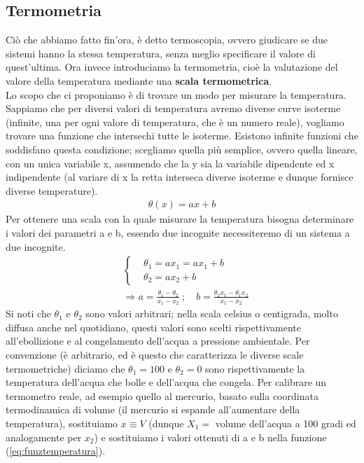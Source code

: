 \documentclass[
10pt, %
a4paper, %
oneside, %
headinclude,footinclude, %
BCOR5mm, %
]{scrartcl}
\begin{document}
\subsection{Termometria}
Ciò che abbiamo fatto fin'ora, è detto termoscopia, ovvero giudicare se due sistemi hanno la stessa temperatura, senza meglio specificare il valore di quest'ultima. Ora invece introduciamo la termometria, cioè la valutazione del valore della temperatura mediante una \textbf{scala termometrica}. \\
Lo scopo che ci proponiamo è di trovare un modo per misurare la temperatura. Sappiamo che per diversi valori di temperatura avremo diverse curve isoterme (infinite, una per ogni valore di temperatura, che è un numero reale), vogliamo trovare una funzione che intersechi tutte le isoterme. Esistono infinite funzioni che soddisfano questa condizione; scegliamo quella più semplice, ovvero quella lineare, con un unica variabile x, assumendo che la y sia la variabile dipendente ed x indipendente (al variare di x la retta interseca diverse isoterme e dunque fornisce diverse temperature).
\begin{align}\label{eq:funztemperatura}
	\theta (x) = a x + b
\end{align}  
Per ottenere una scala con la quale misurare la temperatura bisogna determinare i valori dei parametri a e b, essendo due incognite necessiteremo di un sistema a due incognite. 
\begin{align*} 
	&\begin{cases}
		&\theta_1 = a x_1 = a x_1 + b\\
		&\theta_2 = a x_2 + b  
	\end{cases}\\
	&\Rightarrow a = \frac{\theta_1 - \theta_2}{x_1 - x_2}\ ; \quad b = \frac{\theta_2 x_1 - \theta_1 x_2}{x_1 - x_2 }
\end{align*} 
Si noti che $\theta_1$ e $\theta_2$ sono valori arbitrari; nella scala celsius o centigrada, molto diffusa anche nel quotidiano, questi valori sono scelti rispettivamente all'ebollizione e al congelamento dell'acqua a pressione ambientale. Per convenzione (è arbitrario, ed è questo che caratterizza le diverse scale termometriche) diciamo che $\theta_1 = 100$ e $\theta_2 = 0$ sono rispettivamente la temperatura dell'acqua che bolle e dell'acqua che congela. Per calibrare un termometro reale, ad esempio quello al mercurio, basato sulla coordinata termodinamica di volume (il mercurio si espande all'aumentare della temperatura), sostituiamo $x \equiv V$ (dunque $X_1=$ volume dell'acqua a 100 gradi ed analogamente per $x_2$) e sostituiamo i valori ottenuti di a e b nella funzione (\ref{eq:funztemperatura}).
\end{document}
